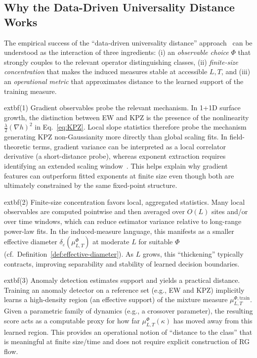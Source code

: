 \documentclass[aps,pre,reprint,amsmath,amssymb,superscriptaddress]{revtex4-2}
\begin{document}
\subsection{Why the Data-Driven Universality Distance Works}
\label{sec:why-it-works}

The empirical success of the ``data-driven universality distance'' approach~\cite{Bentley2026} can be understood as the interaction of three ingredients: (i) an \emph{observable choice} $\Phi$ that strongly couples to the relevant operator distinguishing classes, (ii) \emph{finite-size concentration} that makes the induced measures stable at accessible $L,T$, and (iii) an \emph{operational metric} that approximates distance to the learned support of the training measure.

	extbf{(1) Gradient observables probe the relevant mechanism.} In 1+1D surface growth, the distinction between EW and KPZ is the presence of the nonlinearity $\frac{\lambda}{2}(\nabla h)^2$ in Eq.~\eqref{eq:KPZ}. Local slope statistics therefore probe the mechanism generating KPZ non-Gaussianity more directly than global scaling fits. In field-theoretic terms, gradient variance can be interpreted as a local correlator derivative (a short-distance probe), whereas exponent extraction requires identifying an extended scaling window~\cite{FamilyVicsek1985}. This helps explain why gradient features can outperform fitted exponents at finite size even though both are ultimately constrained by the same fixed-point structure.

	extbf{(2) Finite-size concentration favors local, aggregated statistics.} Many local observables are computed pointwise and then averaged over $O(L)$ sites and/or over time windows, which can reduce estimator variance relative to long-range power-law fits. In the induced-measure language, this manifests as a smaller effective diameter $\delta_\varepsilon(\mu^\Phi_{L,T})$ at moderate $L$ for suitable $\Phi$ (cf.~Definition~\ref{def:effective-diameter}). As $L$ grows, this ``thickening'' typically contracts, improving separability and stability of learned decision boundaries.

	extbf{(3) Anomaly detection estimates support and yields a practical distance.} Training an anomaly detector on a reference set (e.g., EW and KPZ) implicitly learns a high-density region (an effective support) of the mixture measure $\mu^{\Phi,\mathrm{train}}_{L,T}$. Given a parametric family of dynamics (e.g., a crossover parameter), the resulting score acts as a computable proxy for how far $\mu^\Phi_{L,T}(\kappa)$ has moved away from this learned region. This provides an operational notion of ``distance to the class'' that is meaningful at finite size/time and does not require explicit construction of RG flow.
\end{document}
